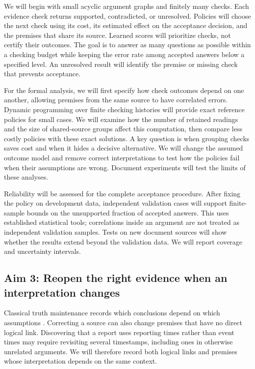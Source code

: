 \documentclass[12pt]{article}
\begin{document}
We will begin with small acyclic argument graphs and finitely many checks. Each evidence check returns supported, contradicted, or unresolved. Policies will choose the next check using its cost, its estimated effect on the acceptance decision, and the premises that share its source. Learned scores will prioritize checks, not certify their outcomes. The goal is to answer as many questions as possible within a checking budget while keeping the error rate among accepted answers below a specified level. An unresolved result will identify the premise or missing check that prevents acceptance.

For the formal analysis, we will first specify how check outcomes depend on one another, allowing premises from the same source to have correlated errors. Dynamic programming over finite checking histories will provide exact reference policies for small cases. We will examine how the number of retained readings and the size of shared-source groups affect this computation, then compare less costly policies with these exact solutions. A key question is when grouping checks saves cost and when it hides a decisive alternative. We will change the assumed outcome model and remove correct interpretations to test how the policies fail when their assumptions are wrong. Document experiments will test the limits of these analyses.

Reliability will be assessed for the complete acceptance procedure. After fixing the policy on development data, independent validation cases will support finite-sample bounds on the unsupported fraction of accepted answers. This uses established statistical tools; correlations inside an argument are not treated as independent validation samples. Tests on new document sources will show whether the results extend beyond the validation data. We will report coverage and uncertainty intervals.

\subsection*{Aim 3: Reopen the right evidence when an interpretation changes}

Classical truth maintenance records which conclusions depend on which assumptions \citep{dekleer1986atms}. Correcting a source can also change premises that have no direct logical link. Discovering that a report uses reporting times rather than event times may require revisiting several timestamps, including ones in otherwise unrelated arguments. We will therefore record both logical links and premises whose interpretation depends on the same context.
\end{document}
